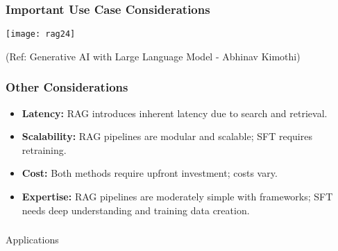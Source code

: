 

\begin{frame}[fragile]\frametitle{Important Use Case Considerations}


		\begin{center}
		\texttt{[image: rag24]}
		\end{center}

{\tiny (Ref: Generative AI with Large Language Model - Abhinav  Kimothi)}

\end{frame}

\begin{frame}[fragile]\frametitle{Other Considerations}
\begin{itemize}
  \item \textbf{Latency:} RAG introduces inherent latency due to search and retrieval.
  \item \textbf{Scalability:} RAG pipelines are modular and scalable; SFT requires retraining.
  \item \textbf{Cost:} Both methods require upfront investment; costs vary.
  \item \textbf{Expertise:} RAG pipelines are moderately simple with frameworks; SFT needs deep understanding and training data creation.
\end{itemize}
\end{frame}


\begin{frame}[fragile]\frametitle{}
\begin{center}
{\Large Applications}
\end{center}
\end{frame}


